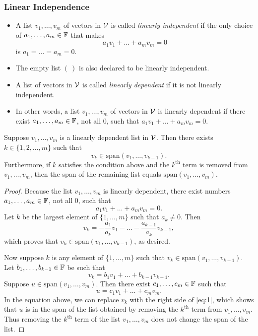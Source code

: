 \subsubsection{Linear Independence}
\begin{definition} \mbox{}
	\begin{itemize}
		\item A list $v_1, \dots, v_m$ of vectors in $\mathcal{V}$ is called \textit{linearly independent} if the only choice of $a_1, \dots, a_m \in \mathbb{F}$ that makes
		\[
		a_1 v_1 + \dots + a_m v_m = 0
		\]
		is $a_1 = \dots = a_m = 0$.
		
		\item The empty list $( \ )$ is also declared to be linearly independent.
	\end{itemize}
\end{definition}
\begin{definition} \mbox{}
	\begin{itemize}
		\item A list of vectors in $\mathcal{V}$ is called \textit{linearly dependent} if it is not linearly independent.
		
		\item In other words, a list $v_1, \dots, v_m$ of vectors in $\mathcal{V}$ is linearly dependent if there exist $a_1, \dots, a_m \in \mathbb{F}$, not all $0$, such that $a_1 v_1 + \dots + a_m v_m = 0$.
	\end{itemize}
\end{definition}
\begin{theorem}
	Suppose $v_1, \dots, v_m$ is a linearly dependent list in $\mathcal{V}$. Then there exists $k \in \{1, 2, \dots, m\}$ such that
	\[
	v_k \in \text{span}(v_1, \dots, v_{k-1}).
	\]
	Furthermore, if $k$ satisfies the condition above and the $k^{\text{th}}$ term is removed from $v_1, \dots, v_m$, then the span of the remaining list equals $\text{span}(v_1, \dots, v_m)$.
\end{theorem}
\begin{proof}
	Because the list $v_1, \dots, v_m$ is linearly dependent, there exist numbers $a_1, \dots, a_m \in \mathbb{F}$, not all $0$, such that
	\[
	a_1 v_1 + \dots + a_m v_m = 0.
	\]
	Let $k$ be the largest element of $\{1, \dots, m\}$ such that $a_k \neq 0$. Then
	\[
	v_k = -\frac{a_1}{a_k} v_1 - \dots - \frac{a_{k-1}}{a_k} v_{k-1},
	\]
	which proves that $v_k \in \text{span}(v_1, \dots, v_{k-1})$, as desired.
	
	Now suppose $k$ is any element of $\{1, \dots, m\}$ such that $v_k \in \text{span}(v_1, \dots, v_{k-1})$. Let $b_1, \dots, b_{k-1} \in \mathbb{F}$ be such that
	\begin{equation} \label{eq:1}
		v_k = b_1 v_1 + \dots + b_{k-1} v_{k-1}.
	\end{equation}
	Suppose $u \in \text{span}(v_1, \dots, v_m)$. Then there exist $c_1, \dots, c_m \in \mathbb{F}$ such that
	\[
	u = c_1 v_1 + \dots + c_m v_m.
	\]
	In the equation above, we can replace $v_k$ with the right side of \eqref{eq:1}, which shows that $u$ is in the span of the list obtained by removing the $k^{\text{th}}$ term from $v_1, \dots, v_m$. Thus removing the $k^{\text{th}}$ term of the list $v_1, \dots, v_m$ does not change the span of the list.
\end{proof}
